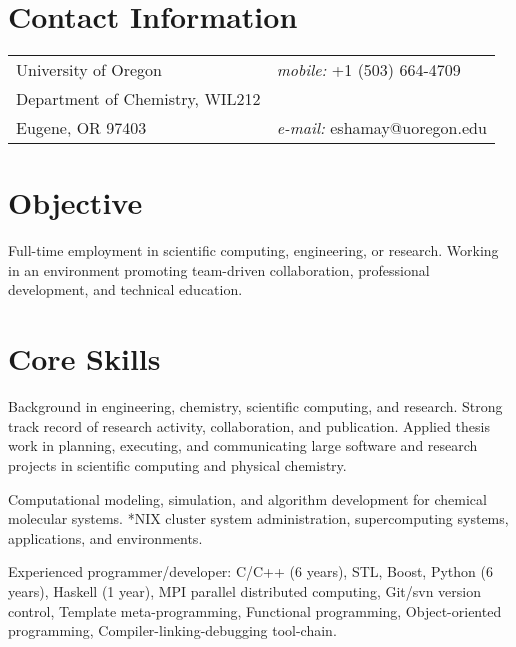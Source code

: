 \documentclass[margin,line]{res}
\begin{document}

\begin{resume}
\section{\sc Contact Information}
\vspace{.05in}
\begin{tabular}{@{}p{3.5in}p{3.5in}}
University of Oregon             		& {\it mobile:}  +1 (503) 664-4709\\
Department of Chemistry, WIL212         & \\
Eugene, OR 97403                    	& {\it e-mail:}  eshamay@uoregon.edu
\end{tabular}


\section{\sc Objective}
Full-time employment in scientific computing, engineering, or research. Working in an environment promoting team-driven collaboration, professional development, and technical education.


\section{\sc Core Skills} 
Background in engineering, chemistry, scientific computing, and research. Strong track record of research activity, collaboration, and publication. Applied thesis work in planning, executing, and communicating large software and research projects in scientific computing and physical chemistry.

\vspace*{-.1in}
Computational modeling, simulation, and algorithm development for chemical molecular systems. *NIX cluster system administration, supercomputing systems, applications, and environments.

\vspace*{-.1in}
Experienced programmer/developer: C/C++ (6 years), STL, Boost, Python (6 years), Haskell (1 year), MPI parallel distributed computing, Git/svn version control, Template meta-programming, Functional programming, Object-oriented programming, Compiler-linking-debugging tool-chain.



\end{resume}
\end{document}
